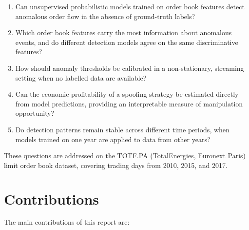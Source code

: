 \documentclass[11pt]{report}
\begin{document}
\begin{enumerate}
    \item Can unsupervised probabilistic models trained on order book features detect anomalous order flow in the absence of ground-truth labels?
    \item Which order book features carry the most information about anomalous events, and do different detection models agree on the same discriminative features?
    \item How should anomaly thresholds be calibrated in a non-stationary, streaming setting when no labelled data are available?
    \item Can the economic profitability of a spoofing strategy be estimated directly from model predictions, providing an interpretable measure of manipulation opportunity?
    \item Do detection patterns remain stable across different time periods, when models trained on one year are applied to data from other years?
\end{enumerate}

These questions are addressed on the TOTF.PA (TotalEnergies, Euronext Paris) limit order book dataset, covering trading days from 2010, 2015, and 2017.


\section{Contributions}\label{sec:intro:contributions}

The main contributions of this report are:
\end{document}
